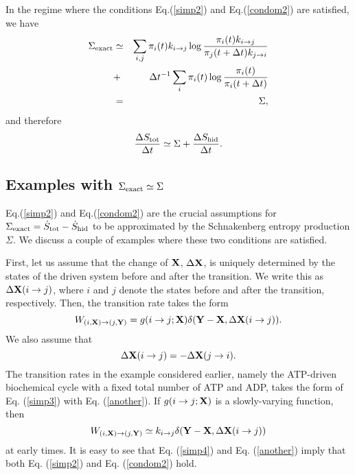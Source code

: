 \documentclass[aps,pre,amsmath,amssymb,floatfix,preprint,nofootinbib]{revtex4}
\begin{document}
In the regime where the conditions Eq.(\ref{simp2}) and Eq.(\ref{condom2}) are satisfied, we have
\begin{eqnarray}
\Sigma_{\rm exact} &\simeq& \sum_{i,j}  \pi_{i}(t) k_{i \to j} \log \frac{\pi_{i}(t) k_{i \to j}}{\pi_{j}(t+ \Delta t) k_{j \to i}} \nonumber\\
&+&  \Delta t^{-1} \sum_{i } \pi_{i}(t)  \log \frac{\pi_{i}(t) }{\pi_{i}(t+ \Delta t)}\nonumber\\
&=& \Sigma,
\end{eqnarray} 
and therefore
\begin{equation}
\frac{\Delta S_{\rm tot}}{\Delta t}  \simeq \Sigma + \frac{\Delta S_{\rm hid}}{\Delta t} .
\end{equation}
\subsection{Examples with $\Sigma_{\rm exact} \simeq \Sigma$}
Eq.(\ref{simp2}) and Eq.(\ref{condom2}) are the crucial assumptions for   $\Sigma_{\rm exact}=\dot S_{\rm tot} - \dot S_{\rm hid}$ to be approximated by the Schnakenberg entropy production $\Sigma$. We discuss a couple of examples where these two conditions are satisfied. 

First, let us assume that the change of ${\bf X}$, $\Delta {\bf X}$, is uniquely determined by the states of the driven system before and after the transition. We write this as $\Delta {\bf X}(i \to j)$, where $i$ and $j$ denote the states before and after the transition, respectively. Then, the transition rate takes the form
\begin{equation}
W_{(i,{\bf X}) \to (j,{\bf Y})} = g(i \to j; {\bf X}) \delta({\bf Y}-{\bf X},\Delta {\bf X}(i \to j)). \label{simp3}
\end{equation}
We also assume that  
\begin{equation}
\Delta {\bf X}(i \to j) = -\Delta {\bf X}(j \to i). \label{another}
\end{equation}
 The transition rates in the example considered earlier, namely the ATP-driven biochemical cycle with a fixed total number of ATP and ADP, takes the form of Eq. (\ref{simp3}) with Eq. (\ref{another}). If $g(i \to j; {\bf X})$ is a slowly-varying function, then
\begin{equation}
W_{(i,{\bf X}) \to (j,{\bf Y})} \simeq k_{i \to j} \delta({\bf Y}-{\bf X},\Delta {\bf X}(i \to j))  \label{simp4}
\end{equation}
at early times.
It is easy to see that Eq. (\ref{simp4}) and Eq. (\ref{another}) imply that both Eq. (\ref{simp2}) and Eq. (\ref{condom2}) hold.
\end{document}
